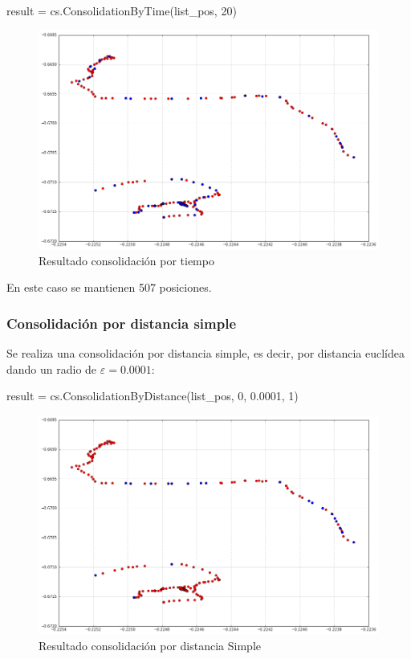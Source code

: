\documentclass[a4paper, 12pt, spanish]{article}
\begin{document}
\begin{python}
result = cs.ConsolidationByTime(list_pos, 20)
\end{python}

\begin{figure}[H]
	\includegraphics[scale=.45]{../comparativa/byTimeSuj1.png}
	\caption{Resultado consolidaci\'on por tiempo}
\end{figure}

En este caso se mantienen 507 posiciones.

\pagebreak
\subsubsection{Consolidaci\'on por distancia simple}

Se realiza una consolidaci\'on por distancia simple, es decir, por distancia eucl\'idea dando un radio de $\varepsilon = 0.0001$:\\

\begin{python}
result = cs.ConsolidationByDistance(list_pos, 0, 0.0001, 1)
\end{python}

\begin{figure}[H]
	\includegraphics[scale=.45]{../comparativa/distanceEuEps10-4.png}
	\caption{Resultado consolidaci\'on por distancia Simple}
\end{figure}
\end{document}
